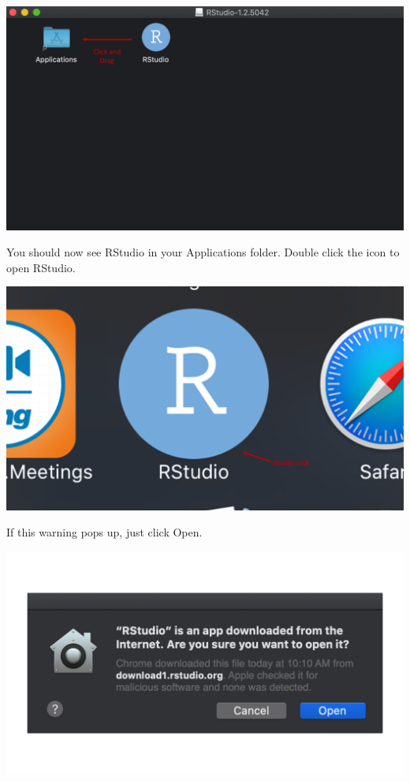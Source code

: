 \documentclass[
  letterpaper,
  DIV=11,
  numbers=noendperiod]{scrreprt}
\begin{document}
\includegraphics{chapters/installing_r_and_rstudio/mac_install_rstudio2.png}

You should now see RStudio in your Applications folder. Double click the
icon to open RStudio.

\includegraphics{chapters/installing_r_and_rstudio/mac_open_rstudio.png}

If this warning pops up, just click Open.

\includegraphics{chapters/installing_r_and_rstudio/mac_open_warning.png}
\end{document}
